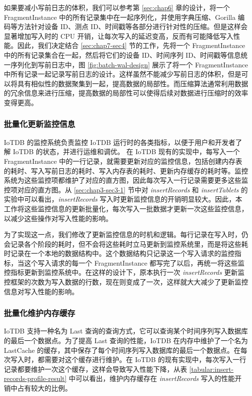  如果要减小写前日志的体积，我们可以参考第 \ref{sec:chap6} 章的设计，将一个 FragmentInstance 中的所有记录集中在一起序列化，并使用字典压缩、Gorilla 编码等方法针对设备 ID、测点 ID、时间戳等各部分进行针对性的压缩。但是这样会显著增加写入时的 CPU 开销，让每次写入的延迟变高，反而有可能降低写入性能。因此，我们决定结合 \ref{sec:chap7-sec4} 节的工作，先将一个 FragmentInstance 中的所有记录集合在一起，然后将它们的设备 ID、时间序列 ID、时间戳等信息统一序列化到写前日志中，图 \ref{fig:batch-wal-design} 展示了将一个 FragmentInstance 中所有记录一起记录写前日志的设计。这样虽然不能减少写前日志的体积，但是可以将具有相似性的数据聚集到一起，提高数据的局部性。而压缩算法通常利用数据的冗余信息来进行压缩，提高数据的局部性可以使得后续对数据进行压缩时的效率变得更高。
\subsubsection{批量化更新监控信息}
 IoTDB 的监控系统负责监控 IoTDB 运行时的各类指标，以便于用户和开发者了解 IoTDB 的状态，并进行运维和调优。
 在 IoTDB 现有的实现中，每写入一个 FragmentInstance 中的一行记录，就需要更新对应的监控信息，包括创建内存表的耗时、写入写前日志的耗时、写入内存表的耗时、更新内存缓存的耗时等。监控系统为这些监控项都维护了对应的直方图，因此每次写入一行记录需要更多这些监控项对应的直方图。从 \ref{sec:chap3-sec3-1} 节中对 \emph{insertRecords} 和 \emph{insertTablets} 的实验中可以看出，\emph{insertRecords} 写入时更新监控信息的开销明显较大。因此，本工作将这些监控信息的更新批量化，每次写入一批数据才更新一次这些监控信息，以减少这些操作对写入性能的影响。

 为了实现这一点，我们修改了更新监控信息的时机和逻辑。每行记录在写入时，仍会记录各个阶段的耗时，但不会将这些耗时立马更新到监控系统里，而是将这些耗时记录在一个本地的数据结构中。这个数据结构只记录这一个写入请求的监控指标，当这个写入请求的每一个 FragmentInstance 都写完了以后，再统一将这些监控指标更新到监控系统中。在这样的设计下，原本执行一次 \emph{insertRecords} 更新监控框架的次数为写入数据的行数，现在则变成了一次，这样就大大减少了更新监控信息对写入性能的影响。

\subsubsection{批量化维护内存缓存}
IoTDB 支持一种名为 Last 查询的查询方式，它可以查询某个时间序列写入数据库的最后一个数据点。为了提高 Last 查询的性能，IoTDB 在内存中维护了一个名为 LastCache 的缓存，其中保存了每个时间序列写入数据库的最后一个数据点。在每次写入时，都需要对这个缓存进行维护。在 IoTDB 的现有实现中，每次写入一行记录都要维护一次这个缓存，这样会导致写入性能下降，从表 \ref{tabular:insert-records-profile-result} 中可以看出，维护内存缓存在 \emph{insertRecords} 写入的性能开销中占有较大的比例。


